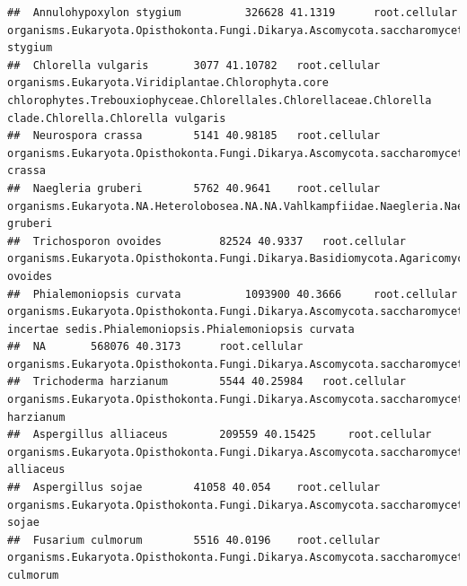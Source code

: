 \documentclass{article}\usepackage[]{graphicx}\usepackage[]{color}
\makeatletter
\newenvironment{kframe}{%
 \def\at@end@of@kframe{}%
 \ifinner\ifhmode%
  \def\at@end@of@kframe{\end{minipage}}%
  \begin{minipage}{\columnwidth}%
 \fi\fi%
 \def\FrameCommand##1{\hskip\@totalleftmargin \hskip-\fboxsep
 \colorbox{shadecolor}{##1}\hskip-\fboxsep
     \hskip-\linewidth \hskip-\@totalleftmargin \hskip\columnwidth}%
 \MakeFramed {\advance\hsize-\width
   \@totalleftmargin\z@ \linewidth\hsize
   \@setminipage}}%
 {\par\unskip\endMakeFramed%
 \at@end@of@kframe}
\newenvironment{knitrout}{}{} %
\makeatother
\begin{document}
\begin{knitrout}
\begin{kframe}
\begin{verbatim}
##  Annulohypoxylon stygium 		 326628 41.1319 	 root.cellular organisms.Eukaryota.Opisthokonta.Fungi.Dikarya.Ascomycota.saccharomyceta.Pezizomycotina.leotiomyceta.sordariomyceta.Sordariomycetes.Xylariomycetidae.Xylariales.NA.Annulohypoxylon.Annulohypoxylon stygium
##  Chlorella vulgaris 		 3077 41.10782 	 root.cellular organisms.Eukaryota.Viridiplantae.Chlorophyta.core chlorophytes.Trebouxiophyceae.Chlorellales.Chlorellaceae.Chlorella clade.Chlorella.Chlorella vulgaris
##  Neurospora crassa 		 5141 40.98185 	 root.cellular organisms.Eukaryota.Opisthokonta.Fungi.Dikarya.Ascomycota.saccharomyceta.Pezizomycotina.leotiomyceta.sordariomyceta.Sordariomycetes.Sordariomycetidae.Sordariales.Sordariaceae.Neurospora.Neurospora crassa
##  Naegleria gruberi 		 5762 40.9641 	 root.cellular organisms.Eukaryota.NA.Heterolobosea.NA.NA.Vahlkampfiidae.Naegleria.Naegleria gruberi
##  Trichosporon ovoides 		 82524 40.9337 	 root.cellular organisms.Eukaryota.Opisthokonta.Fungi.Dikarya.Basidiomycota.Agaricomycotina.Tremellomycetes.Trichosporonales.NA.Trichosporon.Trichosporon ovoides
##  Phialemoniopsis curvata 		 1093900 40.3666 	 root.cellular organisms.Eukaryota.Opisthokonta.Fungi.Dikarya.Ascomycota.saccharomyceta.Pezizomycotina.leotiomyceta.sordariomyceta.Sordariomycetes.Xylariomycetidae.Xylariales.Xylariales incertae sedis.Phialemoniopsis.Phialemoniopsis curvata
##  NA 		 568076 40.3173 	 root.cellular organisms.Eukaryota.Opisthokonta.Fungi.Dikarya.Ascomycota.saccharomyceta.Pezizomycotina.leotiomyceta.sordariomyceta.Sordariomycetes.Hypocreomycetidae.Hypocreales.Clavicipitaceae.Metarhizium.NA
##  Trichoderma harzianum 		 5544 40.25984 	 root.cellular organisms.Eukaryota.Opisthokonta.Fungi.Dikarya.Ascomycota.saccharomyceta.Pezizomycotina.leotiomyceta.sordariomyceta.Sordariomycetes.Hypocreomycetidae.Hypocreales.Hypocreaceae.Trichoderma.Trichoderma harzianum
##  Aspergillus alliaceus 		 209559 40.15425 	 root.cellular organisms.Eukaryota.Opisthokonta.Fungi.Dikarya.Ascomycota.saccharomyceta.Pezizomycotina.leotiomyceta.Eurotiomycetes.Eurotiomycetidae.Eurotiales.Aspergillaceae.Aspergillus.Aspergillus alliaceus
##  Aspergillus sojae 		 41058 40.054 	 root.cellular organisms.Eukaryota.Opisthokonta.Fungi.Dikarya.Ascomycota.saccharomyceta.Pezizomycotina.leotiomyceta.Eurotiomycetes.Eurotiomycetidae.Eurotiales.Aspergillaceae.Aspergillus.Aspergillus sojae
##  Fusarium culmorum 		 5516 40.0196 	 root.cellular organisms.Eukaryota.Opisthokonta.Fungi.Dikarya.Ascomycota.saccharomyceta.Pezizomycotina.leotiomyceta.sordariomyceta.Sordariomycetes.Hypocreomycetidae.Hypocreales.Nectriaceae.Fusarium.NA.Fusarium culmorum

\end{verbatim}
\end{kframe}
\end{knitrout}
\end{document}
